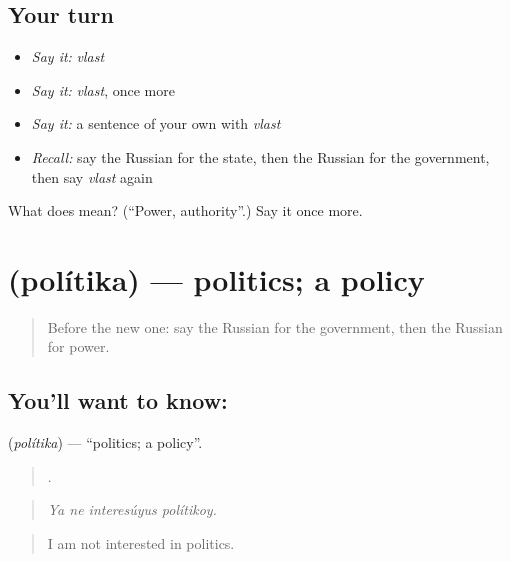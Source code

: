 \subsection*{Your turn}
\begin{itemize}
\raggedright
  \item \emph{Say it:} \emph{vlast}
  \item \emph{Say it:} \emph{vlast}, once more
  \item \emph{Say it:} a sentence of your own with \emph{vlast}
  \item \emph{Recall:} say the Russian for the state, then the Russian for the government, then say \emph{vlast} again
\end{itemize}

\begin{tcolorbox}[breakable,colback=teal!4,colframe=teal!35!black,title={Before you move on}]
What does  mean? (\textquotedblleft{}Power, authority\textquotedblright{}.) Say it once more.
\end{tcolorbox}
\section[\texorpdfstring{\ru{политика} (polítika)}{политика (polítika)}]{ (polítika) — politics; a policy}

\label{lesson:RU-C365-politika}



\begin{quote}
Before the new one: say the Russian for the government, then the Russian for power.
\end{quote}

\subsection*{You'll want to know: }
\textbf{} (\emph{polítika}) — \textquotedblleft{}politics; a policy\textquotedblright{}.

\begin{quote}
   .
\end{quote}

\begin{quote}
\emph{Ya ne interesúyus polítikoy.}
\end{quote}

\begin{quote}
I am not interested in politics.
\end{quote}

